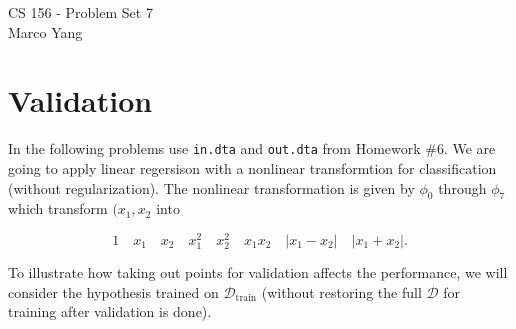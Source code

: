 \documentclass[answers]{exam}
\begin{document}
\begin{center}
{\Large CS 156 - Problem Set 7} \\
\medskip
Marco Yang \\
\bigskip
\end{center}

\section*{\textbf{Validation}}

In the following problems use \verb|in.dta| and \verb|out.dta| from
Homework \#6. We are going to apply linear regersison with a nonlinear 
transformtion for classification (without regularization). The nonlinear
transformation is given by $\phi_0$ through $\phi_7$ which transform
$(x_1,x_{2}$ into

\[
1 \quad x_1 \quad x_2 \quad x_1^2 \quad x_2^2 \quad x_1x_2 \quad |x_1 - x_2| \quad |x_1 + x_2|
.\] 

To illustrate how taking out points for validation affects the performance, we 
will consider the hypothesis trained on $\mathcal{D}_{\text{train}}$ (without
restoring the full $\mathcal{D}$ for training after validation is done).
\end{document}
